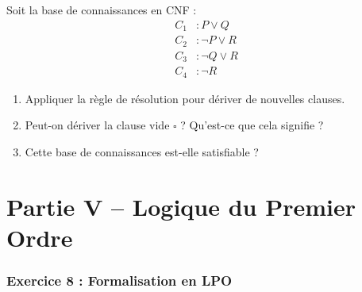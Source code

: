 \documentclass[11pt,a4paper]{article}
\begin{document}
\begin{exercice}
Soit la base de connaissances en CNF :
\begin{align*}
C_1 &: P \lor Q \\
C_2 &: \neg P \lor R \\
C_3 &: \neg Q \lor R \\
C_4 &: \neg R
\end{align*}

\begin{enumerate}[label=\alph*)]
    \item Appliquer la règle de résolution pour dériver de nouvelles clauses.
    \item Peut-on dériver la clause vide $\square$ ? Qu'est-ce que cela signifie ?
    \item Cette base de connaissances est-elle satisfiable ?
\end{enumerate}
\end{exercice}

\part*{Partie V -- Logique du Premier Ordre}

\section*{Exercice 8 : Formalisation en LPO}
\end{document}
